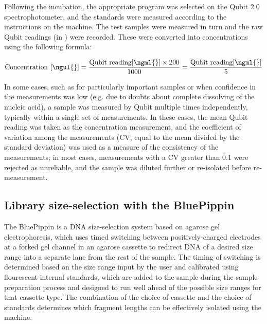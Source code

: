 Following the incubation, the appropriate program was selected on the Qubit 2.0 spectrophotometer, and the standards were measured according to the instructions on the machine. The test samples were measured in turn and the raw Qubit readings (in \ngml{}) were recorded. These were converted into \ngul{} concentrations using the following formula:

\begin{equation}
\mathrm{Concentration~[\ngul{}]} = \frac{\mathrm{Qubit~reading [\ngml{}]} \times 200}{1000} = \frac{\mathrm{Qubit~reading [\ngml{}]}}{5}
\end{equation}

In some cases, such as for particularly important samples or when confidence in the measurements was low (e.g. due to doubts about complete dissolving of the nucleic acid), a sample was measured by Qubit multiple times independently, typically within a single set of measurements. In these cases, the mean Qubit reading was taken as the concentration measurement, and the coefficient of variation among the measurements (CV, equal to the mean divided by the standard deviation) was used as a measure of the consistency of the measurements; in most cases, measurements with a CV greater than 0.1 %
were rejected as unreliable, and the sample was diluted further or re-isolated before re-measurement.

\subsection{Library size-selection with the BluePippin}

The BluePippin is a DNA size-selection system based on agarose gel electrophoresis, which uses timed switching between positively-charged electrodes at a forked gel channel in an agarose cassette to redirect DNA of a desired size range into a separate lane from the rest of the sample. %
The timing of switching is determined based on the size range input by the user and calibrated using flourescent internal standards, which are added to the sample during the sample preparation process and designed to run well ahead of the possible size ranges for that cassette type. The combination of the choice of cassette and the choice of standards determines which fragment lengths can be effectively isolated using the machine.

